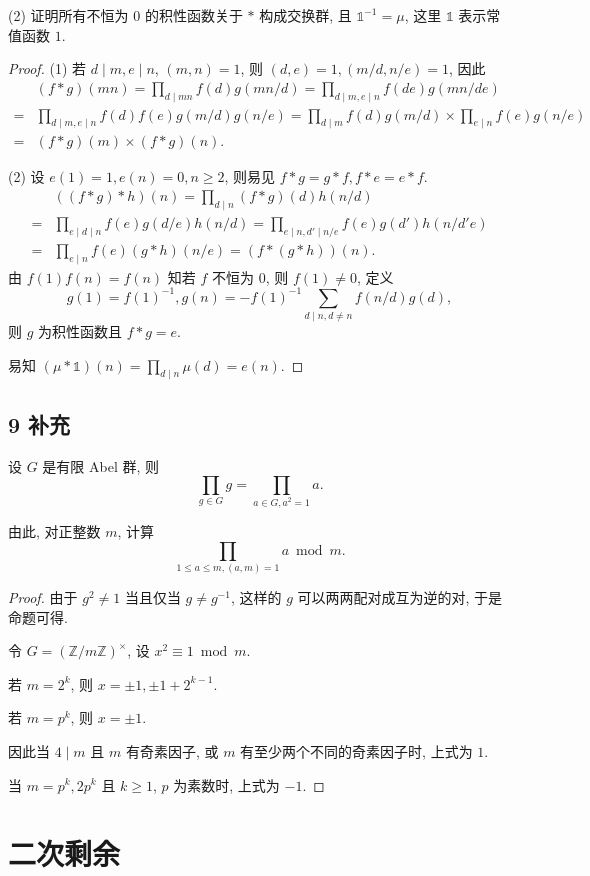 \documentclass[12pt,a4paper,reqno]{amsart}
\theoremstyle{remark}
\newcommand{\Z}{\mathbb{Z}}
\renewcommand{\le}{\leqslant}
\renewcommand{\ge}{\geqslant}
\begin{document}
(2) 证明所有不恒为 $0$ 的积性函数关于 $*$ 构成交换群, 且 $\mathds{1}^{-1}=\mu$, 这里 $\mathds{1}$ 表示常值函数 $1$.

\begin{proof}
(1) 若 $d\mid m, e\mid n$, $(m,n)=1$, 则 $(d,e)=1,(m/d,n/e)=1$, 因此
  \[\begin{split}
       &(f*g)(mn)
      =\prod_{d\mid mn}f(d)g(mn/d)
      =\prod_{d\mid m,e\mid n}f(de)g(mn/de)\\
      =&\prod_{d\mid m,e\mid n}f(d)f(e)g(m/d)g(n/e)
      =\prod_{d\mid m}f(d)g(m/d)\times \prod_{e\mid n}f(e)g(n/e)\\
      =&(f*g)(m)\times (f*g)(n).
  \end{split}\]

(2) 设 $e(1)=1,e(n)=0,n\ge 2$, 则易见 $f*g=g*f,f*e=e*f$.
  \[\begin{split}
     &((f*g)*h)(n)=\prod_{d\mid n}(f*g)(d)h(n/d)\\
    =&\prod_{e\mid d\mid n}f(e)g(d/e)h(n/d)
    =\prod_{e\mid n,d'\mid n/e}f(e)g(d')h(n/d'e)\\
    =&\prod_{e\mid n}f(e)(g*h)(n/e)
    =(f*(g*h))(n).
  \end{split}\]
由 $f(1)f(n)=f(n)$ 知若 $f$ 不恒为 $0$, 则 $f(1)\neq 0$, 定义
  \[g(1)=f(1)^{-1},g(n)=-f(1)^{-1} \sum_{d\mid n,d\neq n} f(n/d)g(d),\]
则 $g$ 为积性函数且 $f*g=e$.

易知 $(\mu*\mathds{1})(n)=\prod_{d\mid n}\mu(d)=e(n)$.
\end{proof}

\subsection*{9 补充}
设 $G$ 是有限 Abel 群, 则 \[\prod_{g\in G}g=\prod_{a\in G,a^2=1} a.\]

由此, 对正整数 $m$, 计算
  \[\prod_{1 \le a\le m,(a,m)=1} a\bmod m.\]
\begin{proof}
由于 $g^2\neq 1$ 当且仅当 $g\neq g^{-1}$, 这样的 $g$ 可以两两配对成互为逆的对, 于是命题可得.

令 $G=(\Z/m\Z)^\times$, 设 $x^2\equiv 1\bmod m$.

若 $m=2^k$, 则 $x=\pm 1,\pm1+2^{k-1}$.

若 $m=p^k$, 则 $x=\pm 1$.

因此当 $4\mid m$ 且 $m$ 有奇素因子, 或 $m$ 有至少两个不同的奇素因子时, 上式为 $1$.

当 $m=p^k,2p^k$ 且 $k\ge 1$, $p$ 为素数时, 上式为 $-1$.
\end{proof}
\section{二次剩余}
\end{document}
